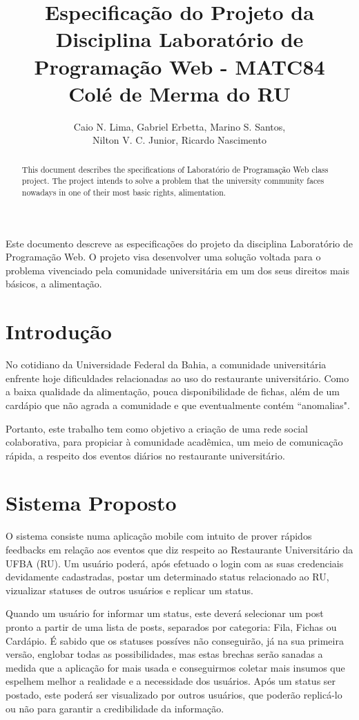 \documentclass[12pt]{article}
\title{Especificação do Projeto da Disciplina Laboratório de Programação Web - MATC84\\ Colé de Merma do RU}
\author{Caio N. Lima\inst{1}, Gabriel Erbetta\inst{1}, Marino S. Santos\inst{1}, \\
  Nilton V. C. Junior\inst{1},  Ricardo Nascimento\inst{1}}
\begin{document}
\maketitle

\begin{abstract}
  This document describes the specifications of Laboratório de Programação Web class project.
  The project intends to solve a problem that the university community faces nowadays 
  in one of their most basic rights, alimentation.
\end{abstract}

\begin{resumo}
  Este documento descreve as especificações do projeto da disciplina Laboratório
  de Programação Web. O projeto visa desenvolver uma solução voltada para o problema
  vivenciado pela comunidade universitária em um dos seus direitos mais básicos, a alimentação.
\end{resumo}


\section{Introdução}

No cotidiano da Universidade Federal da Bahia, a comunidade universitária
enfrente hoje dificuldades relacionadas ao
uso do restaurante universitário. Como a baixa qualidade da alimentação,
pouca disponibilidade de fichas, além de um cardápio que não agrada a comunidade
e que eventualmente contém ``anomalias".

Portanto, este trabalho tem como objetivo a criação de uma rede social colaborativa,
para propiciar à comunidade acadêmica, um meio de comunicação rápida, a respeito dos
eventos diários no restaurante universitário.



\section{Sistema Proposto} \label{sec:firstpage}

O sistema consiste numa aplicação mobile com intuito de prover rápidos feedbacks em relação
aos eventos que diz respeito ao Restaurante Universitário da UFBA (RU). Um usuário poderá,
após efetuado o login com as suas credenciais devidamente cadastradas, postar um determinado
status relacionado ao RU, vizualizar statuses de outros usuários e replicar um status.

Quando um usuário for informar um status, este deverá selecionar um post pronto a partir de uma lista de posts, 
separados por categoria: Fila, Fichas ou Cardápio. É sabido que os statuses possíves não
conseguirão, já na sua primeira versão, englobar todas as possibilidades, mas estas brechas
serão sanadas a medida que a aplicação for mais usada e conseguirmos coletar mais insumos que
espelhem melhor a realidade e a necessidade dos usuários. Após um status ser postado, este poderá
ser visualizado por outros usuários, que poderão replicá-lo ou não para garantir a credibilidade
da informação.
\end{document}
